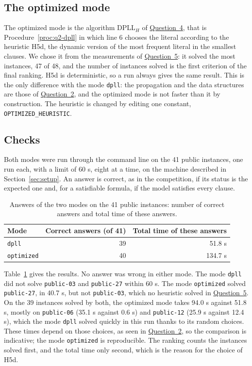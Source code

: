 \subsection{The optimized mode}

The optimized mode is the algorithm DPLL$_H$ of \hyperref[sec:q4]{Question~4}, that is Procedure~\ref{proc:q2-dpll} in which line 6 chooses the literal according to the heuristic H5d, the dynamic version of the most frequent literal in the smallest clauses. We chose it from the measurements of \hyperref[sec:q5]{Question~5}: it solved the most instances, 47 of 48, and the number of instances solved is the first criterion of the final ranking. H5d is deterministic, so a run always gives the same result. This is the only difference with the mode \texttt{dpll}: the propagation and the data structures are those of \hyperref[sec:q2]{Question~2}, and the optimized mode is not faster than it by construction. The heuristic is changed by editing one constant, \texttt{OPTIMIZED\_HEURISTIC}.

\subsection{Checks}

Both modes were run through the command line on the 41 public instances, one run each, with a limit of 60 s, eight at a time, on the machine described in Section~\ref{sec:setup}. An answer is correct, as in the competition, if its status is the expected one and, for a satisfiable formula, if the model satisfies every clause.
\begin{table}[H]
\centering
\begin{tabular}{@{}lrr@{}}
\toprule
Mode & Correct answers (of 41) & Total time of these answers\\
\midrule
\texttt{dpll} & 39 & 51.8 s\\
\texttt{optimized} & 40 & 134.7 s\\
\bottomrule
\end{tabular}
\caption{Answers of the two modes on the 41 public instances: number of correct answers and total time of these answers.}
\label{tab:q6-checks}
\end{table}
Table~\ref{tab:q6-checks} gives the results. No answer was wrong in either mode. The mode \texttt{dpll} did not solve \texttt{public-03} and \texttt{public-27} within 60 s. The mode \texttt{optimized} solved \texttt{public-27}, in 40.7 s, but not \texttt{public-03}, which no heuristic solved in \hyperref[sec:q5]{Question~5}. On the 39 instances solved by both, the optimized mode takes 94.0 s against 51.8 s, mostly on \texttt{public-06} (35.1 s against 0.6 s) and \texttt{public-12} (25.9 s against 12.4 s), which the mode \texttt{dpll} solved quickly in this run thanks to its random choices. These times depend on those choices, as seen in \hyperref[sec:q2]{Question~2}, so the comparison is indicative; the mode \texttt{optimized} is reproducible. The ranking counts the instances solved first, and the total time only second, which is the reason for the choice of H5d.
